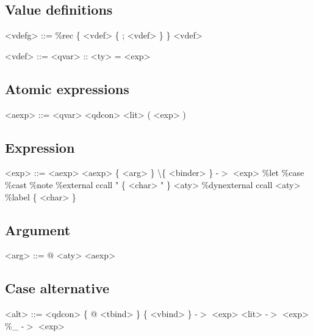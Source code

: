 \subsection*{Value definitions}

\begin{grammar}
<vdefg> ::= \%rec \{ <vdef> \{ ; <vdef> \} \}
       \alt <vdef>
\end{grammar}

\begin{grammar}
<vdef> ::= <qvar> :: <ty> = <exp>
\end{grammar}

\subsection*{Atomic expressions}

\begin{grammar}
<aexp> ::= <qvar>
      \alt <qdcon>
      \alt <lit>
      \alt ( <exp> )
\end{grammar}

\subsection*{Expression}

\begin{grammar}
<exp> ::= <aexp>
     \alt <aexp> \{ <arg> \}
     \alt \textbackslash \{ <binder> \} -$>$ <exp>
     \alt \%let 
     \alt \%case
     \alt \%cast
     \alt \%note
     \alt \%external ccall " \{ <char> " \} <aty>
     \alt \%dynexternal ccall <aty>
     \alt \%label \{ <char> \}
\end{grammar}

\subsection*{Argument}

\begin{grammar}
<arg> ::= @ <aty>
     \alt <aexp>
\end{grammar}

\subsection*{Case alternative}

\begin{grammar}
<alt> ::= <qdcon> \{ @ <tbind> \} \{ <vbind> \} -$>$ <exp>
     \alt <lit> -$>$ <exp>
     \alt \%\_ -$>$ <exp>
\end{grammar}

